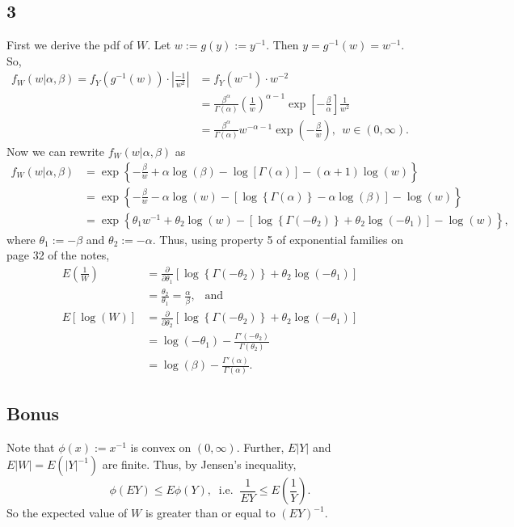 \documentclass[12pt]{article}
\begin{document}
\subsection*{3}
First we derive the pdf of $W$. Let $w := g(y) := y^{-1}$. Then $y = g^{-1}(w) = w^{-1}$. So,
\begin{align*}
  f_{W}(w|\alpha,\beta) = f_{Y}(g^{-1}(w))\cdot \left| \frac{-1}{w^{2}} \right| & = f_{Y}(w^{-1})\cdot w^{-2} \\
  & = \frac{\beta^{\alpha}}{\Gamma(\alpha)}\left( \frac{1}{w} \right)^{\alpha - 1}\exp\left[ -\frac{\beta}{\alpha} \right]\frac{1}{w^{2}} \\
  & = \frac{\beta^{\alpha}}{\Gamma(\alpha)}w^{-\alpha - 1}\exp\left( -\frac{\beta}{w} \right), \ \ w \in (0, \infty).
\end{align*}
Now we can rewrite $f_{W}(w|\alpha,\beta)$ as 
\begin{align*}
  f_{W}(w|\alpha,\beta) & = \exp\left\{ -\frac{\beta}{w} + \alpha\log(\beta) - \log\left[ \Gamma(\alpha) \right] - (\alpha + 1)\log(w) \right\} \\
  & = \exp\left\{ -\frac{\beta}{w} - \alpha\log(w) - \left[ \log\left\{ \Gamma(\alpha) \right\} - \alpha\log(\beta) \right] - \log(w) \right\} \\
  & = \exp\left\{ \theta_1 w^{-1} + \theta_2\log(w) - \left[ \log\left\{ \Gamma(-\theta_2) \right\} + \theta_2\log(-\theta_1) \right] - \log(w) \right\},
\end{align*}
where $\theta_1 := -\beta$ and $\theta_2 := -\alpha$. Thus, using property 5 of exponential families on page 32 of the notes,
\begin{align*}
  E\left( \frac{1}{W} \right) & = \frac{\partial}{\partial \theta_1}\left[ \log\left\{ \Gamma(-\theta_2) \right\} + \theta_2\log(-\theta_1) \right] \\
  & = \frac{\theta_2}{\theta_1} = \frac{\alpha}{\beta}, \ \ \text{ and } \\
  E\left[ \log(W) \right] & =  \frac{\partial}{\partial \theta_2}\left[ \log\left\{ \Gamma(-\theta_2) \right\} + \theta_2\log(-\theta_1) \right] \\
  & = \log(-\theta_1) - \frac{\Gamma'(-\theta_2)}{\Gamma(\theta_2)} \\
  & = \log(\beta) - \frac{\Gamma'(\alpha)}{\Gamma(\alpha)}.
\end{align*}


\subsection*{Bonus}
Note that $\phi(x) := x^{-1}$ is convex on $(0,\infty)$. Further, $E|Y|$ and $E|W| = E(|Y|^{-1})$ are finite. Thus, by Jensen's inequality,
\[
  \phi\left( EY \right) \leq E\phi(Y), \ \text{ i.e. } \ \frac{1}{EY} \leq E\left( \frac{1}{Y} \right).
\]
So the expected value of $W$ is greater than or equal to $(EY)^{-1}$.
\end{document}

